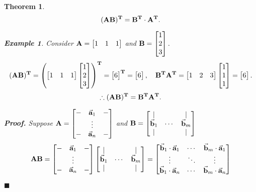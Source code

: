 \documentclass[12pt, a4paper]{article}
\newtheorem{thm}{Theorem}[subsection]
\newtheorem{eg}{Example}[subsection]
\newenvironment*{prf}{\par\indent\textbf{\textit{Proof. }}}{\hfill $\blacksquare$\par}
\def\T{{\vb{T}}}
\def\veca{\va{a}}
\def\vecb{\va{b}}
\def\matrixA{\vb{A}}
\def\matrixB{\vb{B}}
\begin{document}
\begin{thm}
	\[(\matrixA\matrixB)^\T=\matrixB^\T\cdot\matrixA^\T.\]	
	\begin{eg}
		Consider $\matrixA=\begin{bmatrix}1&1&1\end{bmatrix}$ and $\matrixB=\begin{bmatrix}1\\2\\3\end{bmatrix}.$
		\[(\matrixA\matrixB)^\T=\left(\begin{bmatrix}1&1&1\end{bmatrix}\begin{bmatrix}1\\2\\3\end{bmatrix}\right)^\T=\begin{bmatrix}6\end{bmatrix}^\T=\begin{bmatrix}6\end{bmatrix},\quad\matrixB^\T\matrixA^\T=\begin{bmatrix}1&2&3\end{bmatrix}\begin{bmatrix}1\\1\\1\end{bmatrix}=\begin{bmatrix}6\end{bmatrix}.\]	
		\[\therefore(\matrixA\matrixB)^\T=\matrixB^\T\matrixA^\T.\]
	\end{eg}
	\begin{prf}
		Suppose $\matrixA=\begin{bmatrix}-&\veca_1&-\\&\vdots&\\-&\veca_n&-\end{bmatrix}$ and $\matrixB=\begin{bmatrix}|&&|\\\vecb_1&\cdots&\vecb_m\\|&&|\end{bmatrix}$
		\[\matrixA\matrixB=\begin{bmatrix}-&\veca_1&-\\&\vdots&\\-&\veca_n&-\end{bmatrix}\begin{bmatrix}|&&|\\\vecb_1&\cdots&\vecb_m\\|&&|\end{bmatrix}=\begin{bmatrix}\vecb_1\cdot\veca_1&\cdots&\vecb_m\cdot\veca_1\\\vdots&\ddots&\vdots\\\vecb_1\cdot\veca_n&\cdots&\vecb_m\cdot\veca_n\end{bmatrix}\]

\end{prf}
\end{thm}
\end{document}
